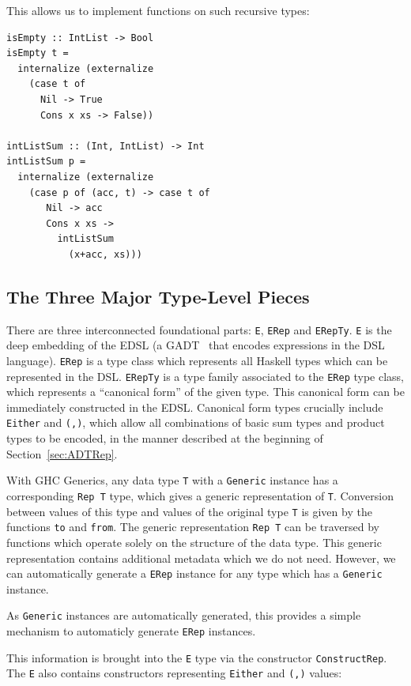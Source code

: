 \documentclass[runningheads, a4paper]{llncs}
\newcommand{\ttt}{\texttt}
\begin{document}
This allows us to implement functions on such recursive types:

\begin{lstlisting}
isEmpty :: IntList -> Bool
isEmpty t =
  internalize (externalize
    (case t of
      Nil -> True
      Cons x xs -> False))

intListSum :: (Int, IntList) -> Int
intListSum p =
  internalize (externalize
    (case p of (acc, t) -> case t of
       Nil -> acc
       Cons x xs ->
         intListSum
           (x+acc, xs)))
\end{lstlisting}

\subsection{The Three Major Type-Level Pieces}

There are three interconnected foundational parts: \ttt{E}, \ttt{ERep} and
\ttt{ERepTy}. \ttt{E} is the deep embedding of the EDSL (a GADT~\cite{Vytiniotis:2006:Simple} that encodes
expressions in the DSL language). \ttt{ERep} is a type class which represents
all Haskell types which can be represented in the DSL. \ttt{ERepTy} is a type
family associated to the \ttt{ERep} type class, which represents a ``canonical form''
of the given type. This canonical form can be immediately constructed in the EDSL.
Canonical form types crucially include \ttt{Either} and \ttt{(,)}, which
allow all combinations of basic sum types and product types to be encoded, in the
manner described at the beginning of Section~\ref{sec:ADTRep}.

With GHC Generics, any data type \ttt{T} with a \ttt{Generic} instance has a
corresponding \ttt{Rep T} type, which gives a generic representation of \ttt{T}.
Conversion between values of this type and values of the original type \ttt{T} is
given by the functions \ttt{to} and \ttt{from}. The generic representation \ttt{Rep T}
can be traversed by functions which operate solely on the structure of the data type.
This generic representation contains additional metadata which we do not need.
However, we can automatically generate a \ttt{ERep} instance for any type which
has a \ttt{Generic} instance.

As \ttt{Generic} instances are automatically generated, this provides a simple mechanism
to automaticly generate \ttt{ERep} instances.


This information is brought into the \ttt{E} type via the constructor
\ttt{ConstructRep}. The \ttt{E} also contains constructors representing \ttt{Either}
and \ttt{(,)} values:
\end{document}
